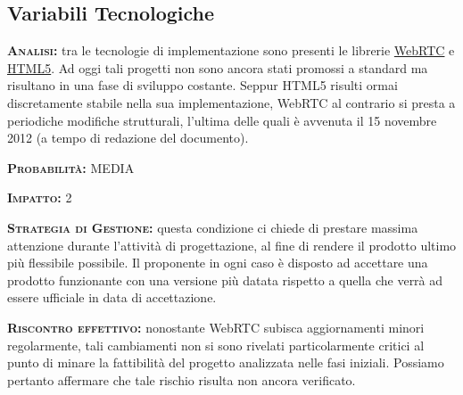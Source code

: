 \subsection{Variabili Tecnologiche}

\begin{description}
	\item{\scshape\bfseries Analisi:} tra le tecnologie di implementazione sono presenti le librerie \underline{WebRTC} e \underline{HTML5}. Ad oggi tali progetti non sono ancora stati promossi a standard ma risultano in una fase di sviluppo costante. Seppur HTML5 risulti ormai discretamente stabile nella sua implementazione, WebRTC al contrario si presta a periodiche modifiche strutturali, l'ultima delle quali è avvenuta il 15 novembre 2012 (a tempo di redazione del documento).
	\item{\scshape\bfseries Probabilità:} MEDIA
	\item{\scshape\bfseries Impatto:} 2
	\item{\scshape\bfseries Strategia di Gestione:} questa condizione ci chiede di prestare massima attenzione durante l'attività di progettazione, al fine di rendere il prodotto ultimo più flessibile possibile. Il proponente in ogni caso è disposto ad accettare una prodotto funzionante con una versione più datata rispetto a quella che verrà ad essere ufficiale in data di accettazione.
	\item{\scshape\bfseries Riscontro effettivo:} nonostante WebRTC subisca aggiornamenti minori regolarmente, tali cambiamenti non si sono rivelati particolarmente critici al punto di minare la fattibilità del progetto analizzata nelle fasi iniziali. Possiamo pertanto affermare che tale rischio risulta non ancora verificato.
\end{description}

